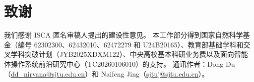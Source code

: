 \section*{致谢}
我们感谢 ISCA 匿名审稿人提出的建设性意见。
本工作部分得到国家自然科学基金（编号 62302300、62432010、62472279 和 U24B20165）、教育部基础学科和交叉学科突破计划（JYB2025XDXM122）、中央高校基本科研业务费以及面向智能体操作系统前沿研究中心（TC20260106010）的支持。
通讯作者：Dong Du（\url{dd\_nirvana@sjtu.edu.cn}）和 Naifeng Jing（\url{sjtuj@sjtu.edu.cn}）。
